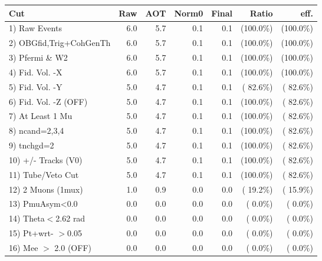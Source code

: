  \begin{table}[h!]\centering
 \begin{tabular}{||l||r|r|r|r|r|r||}
 \hline
 \hline
 Cut & Raw & AOT & Norm0 & Final & Ratio & eff.       \\
 \hline
  1) Raw Events           &          6.0 &          5.7 &          0.1 &          0.1 & (100.0\%) & (100.0\%) \\
  2) OBGfid,Trig+CohGenTh &          6.0 &          5.7 &          0.1 &          0.1 & (100.0\%) & (100.0\%) \\
  3) Pfermi \& W2         &          6.0 &          5.7 &          0.1 &          0.1 & (100.0\%) & (100.0\%) \\
  4) Fid. Vol. -X         &          6.0 &          5.7 &          0.1 &          0.1 & (100.0\%) & (100.0\%) \\
  5) Fid. Vol. -Y         &          5.0 &          4.7 &          0.1 &          0.1 & ( 82.6\%) & ( 82.6\%) \\
  6) Fid. Vol. -Z (OFF)   &          5.0 &          4.7 &          0.1 &          0.1 & (100.0\%) & ( 82.6\%) \\
  7) At Least 1 Mu        &          5.0 &          4.7 &          0.1 &          0.1 & (100.0\%) & ( 82.6\%) \\
  8) ncand=2,3,4          &          5.0 &          4.7 &          0.1 &          0.1 & (100.0\%) & ( 82.6\%) \\
  9) tnchgd=2             &          5.0 &          4.7 &          0.1 &          0.1 & (100.0\%) & ( 82.6\%) \\
 10) +/- Tracks (V0)      &          5.0 &          4.7 &          0.1 &          0.1 & (100.0\%) & ( 82.6\%) \\
 11) Tube/Veto Cut        &          5.0 &          4.7 &          0.1 &          0.1 & (100.0\%) & ( 82.6\%) \\
 12) 2 Muons (1mux)       &          1.0 &          0.9 &          0.0 &          0.0 & ( 19.2\%) & ( 15.9\%) \\
 13) PmuAsym<0.0          &          0.0 &          0.0 &          0.0 &          0.0 & (  0.0\%) & (  0.0\%) \\
 14) Theta$<$2.62 rad     &          0.0 &          0.0 &          0.0 &          0.0 & (  0.0\%) & (  0.0\%) \\
 15) Pt+wrt- $>$0.05      &          0.0 &          0.0 &          0.0 &          0.0 & (  0.0\%) & (  0.0\%) \\
 16) Mee $>$ 2.0  (OFF)   &          0.0 &          0.0 &          0.0 &          0.0 & (  0.0\%) & (  0.0\%) \\

\end{tabular}
\end{table}
